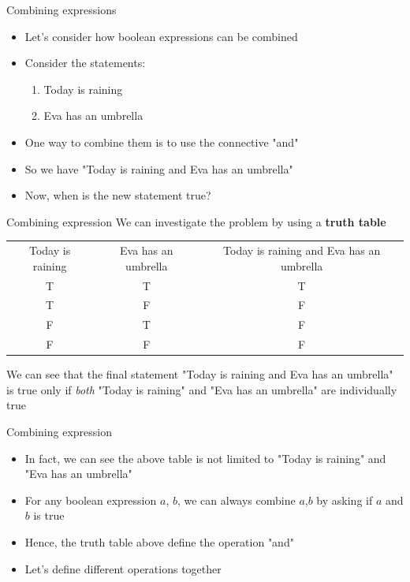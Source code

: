 \documentclass[10pt,xcolor={table,dvipsnames},t]{beamer}
\begin{document}
\begin{frame}{Combining expressions}
  \begin{itemize}
    \item Let's consider how boolean expressions can be combined
    \item Consider the statements:
    \begin{enumerate}
      \item Today is raining
      \item Eva has an umbrella
    \end{enumerate}
    \item One way to combine them is to use the connective "and"
    \item So we have "Today is raining and Eva has an umbrella"
    \item Now, when is the new statement true?
  \end{itemize}
\end{frame}

\begin{frame}{Combining expression}
  We can investigate the problem by using a \textbf{truth table}
  \begin{table}[]
    \begin{tabular}{ccc}
    Today is raining & Eva has an umbrella & Today is raining and Eva has an umbrella \\
    T                & T                   & T                                        \\
    T                & F                   & F                                        \\
    F                & T                   & F                                        \\
    F                & F                   & F                                       
    \end{tabular}
    \end{table}
    We can see that the final statement "Today is raining and Eva has an umbrella" is true only if \textit{both} "Today is raining" and "Eva has an umbrella" are individually true
\end{frame}

\begin{frame}{Combining expression}
  \begin{itemize}
    \item In fact, we can see the above table is not limited to "Today is raining" and "Eva has an umbrella"
    \item For any boolean expression $a$, $b$, we can always combine $a$,$b$ by asking if $a$ and $b$ is true
    \item Hence, the truth table above define the operation "and"
    \item Let's define different operations together
  \end{itemize}
\end{frame}
\end{document}
